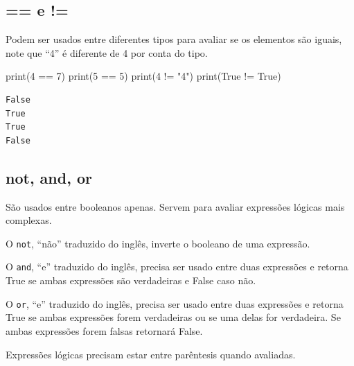 \documentclass[
  letterpaper,
  DIV=11,
  numbers=noendperiod]{scrreprt}
\newenvironment{Shaded}{\begin{snugshade}}{\end{snugshade}}
\newcommand{\BuiltInTok}[1]{\textcolor[rgb]{0.00,0.23,0.31}{#1}}
\newcommand{\DecValTok}[1]{\textcolor[rgb]{0.68,0.00,0.00}{#1}}
\newcommand{\NormalTok}[1]{\textcolor[rgb]{0.00,0.23,0.31}{#1}}
\newcommand{\OperatorTok}[1]{\textcolor[rgb]{0.37,0.37,0.37}{#1}}
\newcommand{\StringTok}[1]{\textcolor[rgb]{0.13,0.47,0.30}{#1}}
\newcommand{\VariableTok}[1]{\textcolor[rgb]{0.07,0.07,0.07}{#1}}
\begin{document}
\hypertarget{e-3}{%
\subsection{== e !=}\label{e-3}}

Podem ser usados entre diferentes tipos para avaliar se os elementos são
iguais, note que ``4'' é diferente de 4 por conta do tipo.

\begin{Shaded}
\begin{Highlighting}[]
    \BuiltInTok{print}\NormalTok{(}\DecValTok{4} \OperatorTok{==} \DecValTok{7}\NormalTok{)}
    \BuiltInTok{print}\NormalTok{(}\DecValTok{5} \OperatorTok{==} \DecValTok{5}\NormalTok{)}
    \BuiltInTok{print}\NormalTok{(}\DecValTok{4} \OperatorTok{!=} \StringTok{"4"}\NormalTok{)}
    \BuiltInTok{print}\NormalTok{(}\VariableTok{True} \OperatorTok{!=} \VariableTok{True}\NormalTok{)}
\end{Highlighting}
\end{Shaded}

\begin{tcolorbox}[enhanced jigsaw, breakable, leftrule=.75mm, left=2mm, opacityback=0, bottomrule=.15mm, toprule=.15mm, rightrule=.15mm, arc=.35mm, colback=white]

\begin{verbatim}
False
True
True
False
\end{verbatim}

\end{tcolorbox}

\hypertarget{not-and-or}{%
\subsection{not, and, or}\label{not-and-or}}

São usados entre booleanos apenas. Servem para avaliar expressões
lógicas mais complexas.

O \texttt{not}, ``não'' traduzido do inglês, inverte o booleano de uma
expressão.

O \texttt{and}, ``e'' traduzido do inglês, precisa ser usado entre duas
expressões e retorna True se ambas expressões são verdadeiras e False
caso não.

O \texttt{or}, ``e'' traduzido do inglês, precisa ser usado entre duas
expressões e retorna True se ambas expressões forem verdadeiras ou se
uma delas for verdadeira. Se ambas expressões forem falsas retornará
False.

Expressões lógicas precisam estar entre parêntesis quando avaliadas.
\end{document}
